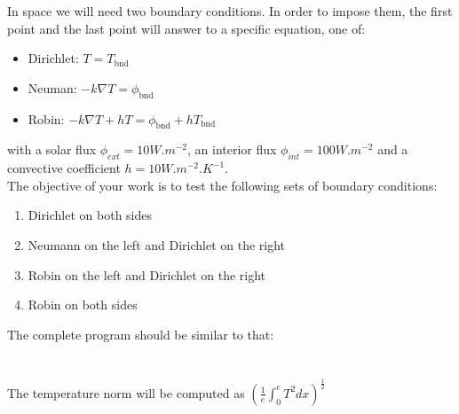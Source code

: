 \documentclass[a4paper,10pt]{article}
\begin{document}
In space we will need two boundary conditions. In order to impose them, the first point and the last point will answer to a specific equation, one of: 
\begin{itemize}
\item Dirichlet: $T = T_{\text{bnd}}$
\item Neuman: $-k\nabla T =\phi_{\text{bnd}}$
\item Robin: $-k\nabla T + hT=\phi_{\text{bnd}} + h T_{\text{bnd}}$
\end{itemize}
with a solar flux $\phi_{ext}=10W.m^{-2}$, an interior flux $\phi_{int}=100W.m^{-2}$ and a convective coefficient $h=10W.m^{-2}.K^{-1}$.\\

\newpage
The objective of your work is to test the following sets of boundary conditions:
\begin{enumerate}
\item Dirichlet on both sides
\item Neumann on the left and Dirichlet on the right
\item Robin on the left and Dirichlet on the right
\item Robin on both sides\\
\end{enumerate}

The complete program should be similar to that:\\
\noindent{}\\~\\

The temperature norm  will be computed as $\left(\frac{1}{e}\int_{0}^{e} T^2dx\right)^\frac{1}{2}$\\
\end{document}
